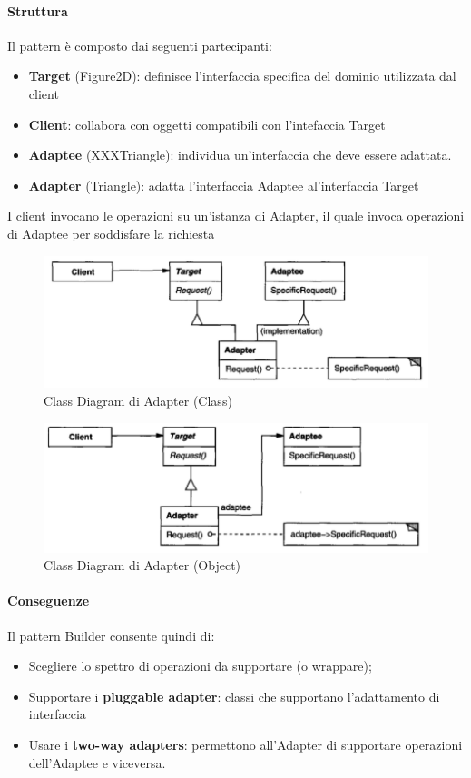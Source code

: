 \paragraph{Struttura} Il pattern è composto dai seguenti partecipanti:
\begin{itemize}
    \item \textbf{Target} (Figure2D): definisce l'interfaccia specifica del dominio utilizzata dal client
    \item \textbf{Client}: collabora con oggetti compatibili con l'intefaccia Target
    \item \textbf{Adaptee} (XXXTriangle): individua un'interfaccia che deve essere adattata.
    \item \textbf{Adapter} (Triangle): adatta l'interfaccia Adaptee al'interfaccia Target
\end{itemize}

I client invocano le operazioni su un'istanza di Adapter, il quale invoca operazioni di Adaptee per soddisfare la richiesta

\begin{figure}[H]
    \centering
    \includegraphics[width=0.75\linewidth]{assets/pattern/adapter/adapter-struttura-class.png}
    \caption{Class Diagram di Adapter (Class)}
\end{figure}

\begin{figure}[H]
    \centering
    \includegraphics[width=0.75\linewidth]{assets/pattern/adapter/adapter-struttura-object.png}
    \caption{Class Diagram di Adapter (Object)}
\end{figure}

\paragraph{Conseguenze} Il pattern Builder consente quindi di:
\begin{itemize}
    \item Scegliere lo spettro di operazioni da supportare (o wrappare);
    \item Supportare i \textbf{pluggable adapter}: classi che supportano l'adattamento di interfaccia
    \item Usare i \textbf{two-way adapters}: permettono all'Adapter di supportare operazioni dell'Adaptee e viceversa.
\end{itemize}

